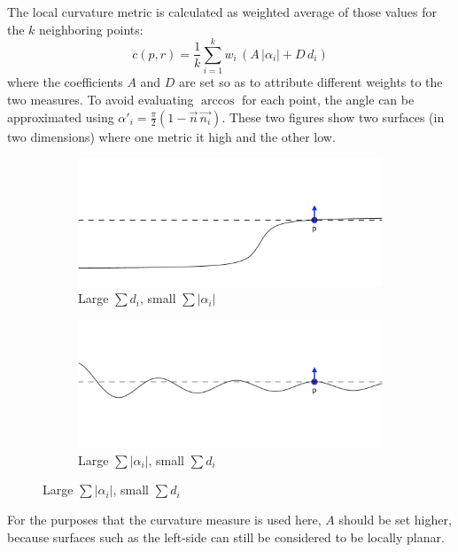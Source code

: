 The local curvature metric is calculated as weighted average of those values for the $k$ neighboring points:
\begin{equation}
c(p, r) = \frac{1}{k} \sum_{i=1}^{k} w_i \, \left( A \, |\alpha_i| + D \, d_i \right)
\end{equation}
where the coefficients $A$ and $D$ are set so as to attribute different weights to the two measures. To avoid evaluating $\arccos$ for each point, the angle can be approximated using $\alpha'_i = \frac{\pi}{2} (1 - \vec{n} \, \vec{n_i})$. These two figures show two surfaces (in two dimensions) where one metric it high and the other low.
\begin{figure}[H]
\centering
\begin{subfigure}{.4\textwidth}
	\includegraphics[width=\linewidth]{fig/curvature_distances.pdf}
	\caption{Large $\sum d_i$, small $\sum |\alpha_i|$}
\end{subfigure}%
\hspace{15mm}%
\begin{subfigure}{.4\textwidth}
	\includegraphics[width=\linewidth]{fig/curvature_angles.pdf}
	\caption{Large $\sum |\alpha_i|$, small $\sum d_i$}
\end{subfigure}	
\end{figure}
For the purposes that the curvature measure is used here, $A$ should be set higher, because surfaces such as the left-side can still be considered to be locally planar.

